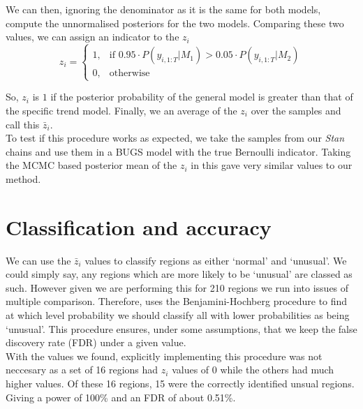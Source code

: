 \documentclass[11pt]{report}
\begin{document}
We can then, ignoring the denominator as it is the same for both models, compute the unnormalised posteriors for the two models. Comparing these two values, we can assign an indicator to the $z_i$
\begin{equation}
z_i = \left\{%
\begin{array}{ll}
1, & \text{if } 0.95 \cdot P(y_{i,1:T} | M_1) > 0.05 \cdot P(y_{i,1:T} | M_2) \\
0, & \text{otherwise}
\end{array}\right.
\end{equation}

So, $z_i$ is $1$ if the posterior probability of the general model is greater than that of the specific trend model. Finally, we an average of the $z_i$ over the samples and call this $\bar{z}_i$. \\

To test if this procedure works as expected, we take the samples from our \emph{Stan} chains and use them in a BUGS model with the true Bernoulli indicator. Taking the MCMC based posterior mean of the $z_i$ in this gave very similar values to our method. 



\section{Classification and accuracy}

We can use the $\bar{z}_i$ values to classify regions as either `normal' and `unusual'. We could simply say, any regions which are more likely to be `unusual' are classed as such. However given we are performing this for 210 regions we run into issues of multiple comparison. Therefore, \citet{baystdetect} uses the Benjamini-Hochberg procedure to find at which level probability we should classify all with lower probabilities as being `unusual'. This procedure ensures, under some assumptions, that we keep the false discovery rate (FDR) under a given value. \\

With the values we found, explicitly implementing this procedure was not neccesary as a set of 16 regions had $z_i$ values of 0 while the others had much higher values. Of these 16 regions, 15 were the correctly identified unsual regions. Giving a power of 100\% and an FDR of about 0.51\%.
\end{document}
